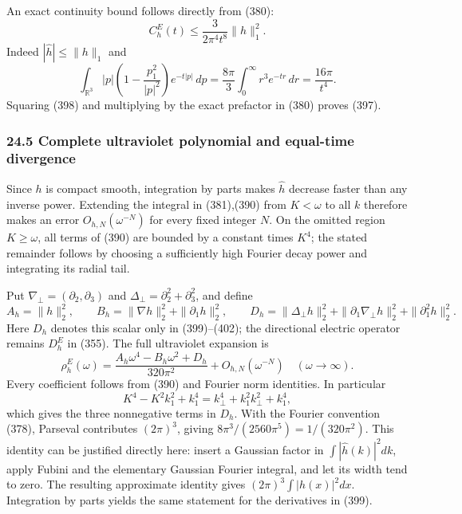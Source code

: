 \documentclass[
  11pt,
]{article}
\begin{document}
An exact continuity bound follows directly from (380): \[
 \boxed{C^E_h(t)\le\frac{3}{2\pi^4t^8}\|h\|_1^2.}
 \tag{397}
\] Indeed \(|\widehat h|\le\|h\|_1\) and \[
 \int_{\mathbb R^3}|p|
 \left(1-\frac{p_1^2}{|p|^2}\right)e^{-t|p|}\,dp
 =\frac{8\pi}{3}\int_0^\infty r^3e^{-tr}\,dr
 =\frac{16\pi}{t^4}.
 \tag{398}
\] Squaring (398) and multiplying by the exact prefactor in (380) proves
(397).

\subsubsection{24.5 Complete ultraviolet polynomial and equal-time
divergence}\label{complete-ultraviolet-polynomial-and-equal-time-divergence}

Since \(h\) is compact smooth, integration by parts makes \(\widehat h\)
decrease faster than any inverse power. Extending the integral in
(381),(390) from \(K<\omega\) to all \(k\) therefore makes an error
\(O_{h,N}(\omega^{-N})\) for every fixed integer \(N\). On the omitted
region \(K\ge\omega\), all terms of (390) are bounded by a constant
times \(K^4\); the stated remainder follows by choosing a sufficiently
high Fourier decay power and integrating its radial tail.

Put \(\nabla_\perp=(\partial_2,\partial_3)\) and
\(\Delta_\perp=\partial_2^2+\partial_3^2\), and define \[
 A_h=\|h\|_2^2,\qquad
 B_h=\|\nabla h\|_2^2+\|\partial_1h\|_2^2,\qquad
 D_h=\|\Delta_\perp h\|_2^2+
        \|\partial_1\nabla_\perp h\|_2^2+
        \|\partial_1^2h\|_2^2 .
 \tag{399}
\] Here \(D_h\) denotes this scalar only in (399)--(402); the
directional electric operator remains \(D^E_h\) in (355). The full
ultraviolet expansion is \[
 \boxed{
 \rho^E_h(\omega)=
 \frac{A_h\omega^4-B_h\omega^2+D_h}{320\pi^2}
          +O_{h,N}(\omega^{-N})\quad(\omega\to\infty).
 }
 \tag{400}
\] Every coefficient follows from (390) and Fourier norm identities. In
particular \[
 K^4-K^2k_1^2+k_1^4
 =k_\perp^4+k_1^2k_\perp^2+k_1^4,
 \tag{401}
\] which gives the three nonnegative terms in \(D_h\). With the Fourier
convention (378), Parseval contributes \((2\pi)^3\), giving
\(8\pi^3/(2560\pi^5)=1/(320\pi^2)\). This identity can be justified
directly here: insert a Gaussian factor in \(\int|\widehat h(k)|^2dk\),
apply Fubini and the elementary Gaussian Fourier integral, and let its
width tend to zero. The resulting approximate identity gives
\((2\pi)^3\int|h(x)|^2dx\). Integration by parts yields the same
statement for the derivatives in (399).
\end{document}
